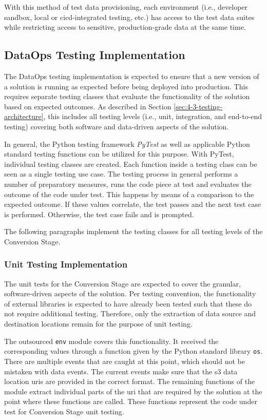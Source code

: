 With this method of test data provisioning, each environment (i.e., developer sandbox, local or \ac{cicd}-integrated testing, etc.) has access to the test data suites while restricting access to sensitive, production-grade data at the same time.

\subsection{DataOps Testing Implementation}
The DataOps testing implementation is expected to ensure that a new version of a solution is running as expected before being deployed into production. This requires separate testing classes that evaluate the functionality of the solution based on expected outcomes. As described in Section \ref{sec:4-3-testing-architecture}, this includes all testing levels (i.e., unit, integration, and end-to-end testing) covering both software and data-driven aspects of the solution. 

In general, the Python testing framework \textit{PyTest} as well as applicable Python standard testing functions can be utilized for this purpose. With PyTest, individual testing classes are created. Each function inside a testing class can be seen as a single testing use case. The testing process in general performs a number of preparatory measures, runs the code piece at test and evaluates the outcome of the code under test. This happens by means of a comparison to the expected outcome. If these values correlate, the test passes and the next test case is performed. Otherwise, the test case fails and is prompted.

The following paragraphs implement the testing classes for all testing levels of the Conversion Stage.

\subsubsection{Unit Testing Implementation}
The unit tests for the Conversion Stage are expected to cover the granular, software-driven aspects of the solution. Per testing convention, the functionality of external libraries is expected to have already been tested such that these do not require additional testing. Therefore, only the extraction of data source and destination locations remain for the purpose of unit testing.

The outsourced \texttt{env} module covers this functionality. It received the corresponding values through a function given by the Python standard library \texttt{os}. There are multiple events that are caught at this point, which should not be mistaken with data events. The current events make sure that the \ac{s3} data location \acp{uri} are provided in the correct format. The remaining functions of the module extract individual parts of the \ac{uri} that are required by the solution at the point where these functions are called. These functions represent the code under test for Conversion Stage unit testing.

